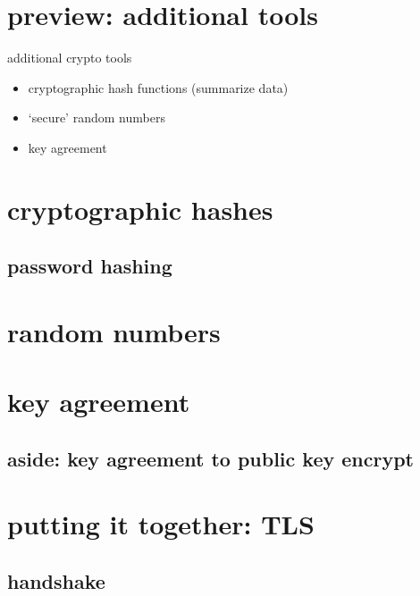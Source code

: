 \section{preview: additional tools}
\begin{frame}{additional crypto tools}
    \begin{itemize}
    \item cryptographic hash functions (summarize data)
    \item `secure' random numbers
    \item key agreement
    \end{itemize}
\end{frame}

\section{cryptographic hashes}



\subsection{password hashing}



\section{random numbers}


\section{key agreement}



\subsection{aside: key agreement to public key encrypt}


\section{putting it together: TLS}

\subsection{handshake}


